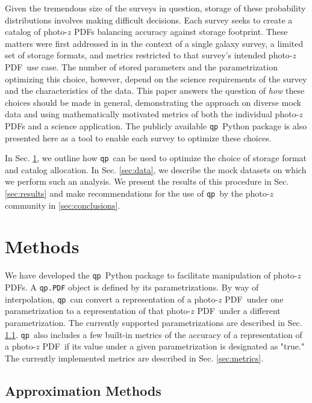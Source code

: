 \documentclass[\docopts]{\docclass}
\newcommand{\qp}{\texttt{qp}}
\newcommand{\pz}{photo-$z$ PDF}
\begin{document}
Given the tremendous size of the surveys in question, storage of these 
probability distributions involves making difficult decisions.  Each survey 
seeks to create a catalog of \pz s balancing accuracy against storage 
footprint.  These matters were first addressed in 
\citet{carrasco_kind_sparse_2014} in the context of a single galaxy survey, a 
limited set of storage formats, and metrics restricted to that survey's 
intended \pz\ use case.  The number of stored parameters and the 
parametrization optimizing this choice, however, depend on the science 
requirements of the survey and the characteristics of the data.  This paper 
answers the question of \textit{how} these choices should be made in general, 
demonstrating the approach on diverse mock data and using mathematically 
motivated metrics of both the individual \pz s and a science application.  The 
publicly available \qp\ Python package is also presented here as a tool to 
enable each survey to optimize these choices.

In Sec. \ref{sec:methods}, we outline how \qp\ can be used to optimize the 
choice of storage format and catalog allocation.  In Sec. \ref{sec:data}, we 
describe the mock datasets on which we perform such an analysis.  We present 
the results of this procedure in Sec. \ref{sec:results} and make 
recommendations for the use of \qp\ by the photo-$z$ community in 
\ref{sec:conclusions}.








\section{Methods}
\label{sec:methods}



We have developed the \qp\ Python package to facilitate manipulation of \pz s.  
A \texttt{qp.PDF} object is defined by its parametrizations.  By way of 
interpolation, \qp\ can convert a representation of a \pz\ under one 
parametrization to a representation of that \pz\ under a different 
parametrization.  The currently supported parametrizations are described in 
Sec. \ref{sec:approx}.  \qp\ also includes a few built-in metrics of the 
accuracy of a representation of a \pz\ if its value under a given 
parametrization is designated as "true."  The currently implemented metrics are 
described in Sec. \ref{sec:metrics}.

\subsection{Approximation Methods}
\label{sec:approx}
\end{document}
